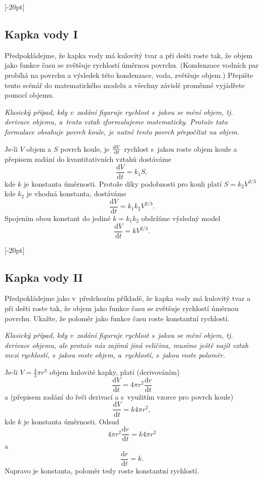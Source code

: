 \konec

[-20pt]

\subsection{Kapka vody I}
Předpokládejme, že kapka vody má kulovitý tvar a při dešti roste tak, že objem
jako funkce času se zvětšuje rychlostí úměrnou povrchu. (Kondenzace vodních par probíhá
na povrchu a výsledek této kondenzace, voda, zvětšuje objem.) Přepište tento scénář do matematického modelu a všechny závislé proměnné vyjádřete pomocí objemu.

\textit{Klasický případ, kdy v zadání figuruje rychlost s jakou se mění objem, tj. derivace objemu, a tento vztah zformulujeme matematicky. Protože tato formulace obsahuje povrch koule, je nutné tento povrch přepočítat na objem.}

\reseni Je-li $V$ objem a $S$ povrch koule, je $\frac{\mathrm{d}V}{\mathrm{d}t}$ rychlost s jakou roste objem koule a přepisem zadání do kvantitativních vztahů dostáváme
$$\frac {\mathrm dV}{\mathrm dt}= k_1S, $$ kde $k$ je konstanta úměrnosti. Protože díky podobnosti pro kouli platí $S=k_2 V^{2/3}$ kde $k_2$ je vhodná konstanta, dostáváme 
$$\frac{\mathrm dV}{\mathrm dt}=k_1k_2 V^{2/3}.$$ Spojením obou konstant do jediné $k=k_1k_2$ obdržíme výsledný model 
$$\frac{\mathrm dV}{\mathrm dt}=kV^{2/3}.$$ 
\konec



[-20pt]

\subsection{Kapka vody II}
Předpokládejme jako v předchozím příkladě, že kapka vody má kulovitý tvar a při dešti roste tak, že objem
jako funkce času se zvětšuje rychlostí úměrnou povrchu. Ukažte,
že poloměr jako funkce času roste konstantní rychlostí.

\textit{Klasický případ, kdy v zadání figuruje rychlost s jakou se mění objem, tj. derivace objemu, ale protože nás zajímá jiná veličina, musíme ještě najít vztah mezi rychlostí, s jakou roste objem, a rychlostí, s jakou roste poloměr.}

\reseni Je-li $V=\frac 43 \pi r^3$ objem kulovité kapky, platí
(derivováním) $$\frac {\mathrm dV}{\mathrm dt}=4\pi r^2\frac{\mathrm dr}{\mathrm dt}$$
a (přepisem zadání do řeči derivací a s využitím vzorce pro povrch koule)
$$\frac {\mathrm dV}{\mathrm dt}= k 4\pi r^2, $$ kde $k$ je konstanta úměrnosti. Odsud
$$4\pi r^2\frac{\mathrm dr}{\mathrm dt}=k 4\pi r^2$$
a
$$\frac{\mathrm dr}{\mathrm dt}=k.$$ Napravo je konstanta, poloměr tedy roste konstantní rychlostí.
\konec


